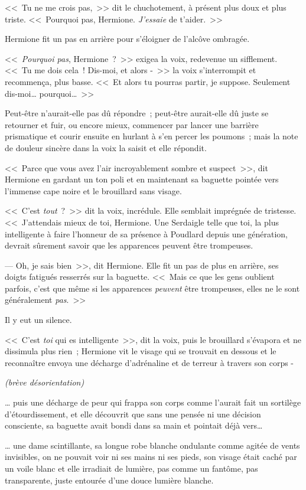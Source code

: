 <<~Tu ne me crois pas,~>> dit le chuchotement, à présent plus doux et plus triste. <<~Pourquoi pas, Hermione. \emph{J'essaie} de t'aider.~>>

Hermione fit un pas en arrière pour s'éloigner de l'alcôve ombragée.

<<~\emph{Pourquoi pas}, Hermione~?~>> exigea la voix, redevenue un sifflement. <<~Tu me dois cela~! Dis-moi, et alors -~>> la voix s'interrompit et recommença, plus basse. <<~Et alors tu pourras partir, je suppose. Seulement dis-moi… pourquoi…~>>

Peut-être n'aurait-elle pas dû répondre~; peut-être aurait-elle dû juste se retourner et fuir, ou encore mieux, commencer par lancer une barrière prismatique et courir ensuite en hurlant à s'en percer les poumons~; mais la note de douleur sincère dans la voix la saisit et elle répondit.

<<~Parce que vous avez l'air incroyablement sombre et suspect~>>, dit Hermione en gardant un ton poli et en maintenant sa baguette pointée vers l'immense cape noire et le brouillard sans visage.

<<~C'est \emph{tout}~?~>> dit la voix, incrédule. Elle semblait imprégnée de tristesse. <<~J'attendais mieux de toi, Hermione. Une Serdaigle telle que toi, la plus intelligente à faire l'honneur de sa présence à Poudlard depuis une génération, devrait sûrement savoir que les apparences peuvent être trompeuses.

--- Oh, je sais bien~>>, dit Hermione. Elle fit un pas de plus en arrière, ses doigts fatigués resserrés sur la baguette. <<~Mais ce que les gens oublient parfois, c'est que même si les apparences \emph{peuvent} être trompeuses, elles ne le sont généralement \emph{pas}.~>>

Il y eut un silence.

<<~C'est \emph{toi} qui es intelligente~>>, dit la voix, puis le brouillard s'évapora et ne dissimula plus rien~; Hermione vit le visage qui se trouvait en dessous et le reconnaître envoya une décharge d'adrénaline et de terreur à travers son corps -

\emph{(brève désorientation)}

… puis une décharge de peur qui frappa son corps comme l'aurait fait un sortilège d'étourdissement, et elle découvrit que sans une pensée ni une décision consciente, sa baguette avait bondi dans sa main et pointait déjà vers…

… une dame scintillante, sa longue robe blanche ondulante comme agitée de vents invisibles, on ne pouvait voir ni ses mains ni ses pieds, son visage était caché par un voile blanc et elle irradiait de lumière, pas comme un fantôme, pas transparente, juste entourée d'une douce lumière blanche.

